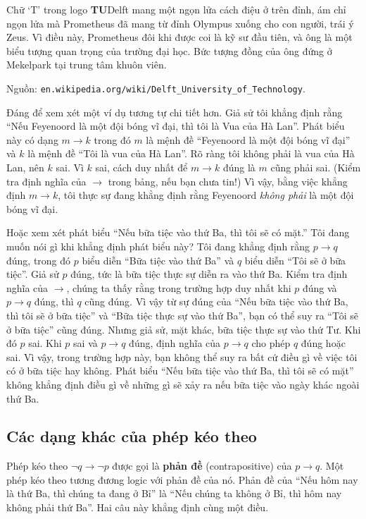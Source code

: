 \begin{infobox}
Chữ `T' trong logo \textbf{TU}Delft mang một ngọn lửa cách điệu ở trên đỉnh, ám chỉ ngọn lửa mà Prometheus đã mang từ đỉnh Olympus xuống cho con người, trái ý Zeus. Vì điều này, Prometheus đôi khi được coi là kỹ sư đầu tiên, và ông là một biểu tượng quan trọng của trường đại học. Bức tượng đồng của ông đứng ở Mekelpark tại trung tâm khuôn viên.

Nguồn: \texttt{en.wikipedia.org/wiki/Delft\_University\_of\_Technology}.
\end{infobox}

Đáng để xem xét một ví dụ tương tự chi tiết hơn. Giả sử tôi khẳng định rằng ``Nếu Feyenoord là một đội bóng vĩ đại, thì tôi là Vua của Hà Lan''. Phát biểu này có dạng $m \to k$ trong đó $m$ là mệnh đề ``Feyenoord là một đội bóng vĩ đại'' và $k$ là mệnh đề ``Tôi là vua của Hà Lan''. Rõ ràng tôi không phải là vua của Hà Lan, nên $k$ sai. Vì $k$ sai, cách duy nhất để $m \to k$ đúng là $m$ cũng phải sai. (Kiểm tra định nghĩa của $\to$ trong bảng, nếu bạn chưa tin!) Vì vậy, bằng việc khẳng định $m \to k$, tôi thực sự đang khẳng định rằng Feyenoord \emph{không phải} là một đội bóng vĩ đại.

Hoặc xem xét phát biểu ``Nếu bữa tiệc vào thứ Ba, thì tôi sẽ có mặt.'' Tôi đang muốn nói gì khi khẳng định phát biểu này? Tôi đang khẳng định rằng $p \to q$ đúng, trong đó $p$ biểu diễn ``Bữa tiệc vào thứ Ba'' và $q$ biểu diễn ``Tôi sẽ ở bữa tiệc''. Giả sử $p$ đúng, tức là bữa tiệc thực sự diễn ra vào thứ Ba. Kiểm tra định nghĩa của $\to$, chúng ta thấy rằng trong trường hợp duy nhất khi $p$ đúng và $p \to q$ đúng, thì $q$ cũng đúng. Vì vậy từ sự đúng của ``Nếu bữa tiệc vào thứ Ba, thì tôi sẽ ở bữa tiệc'' và ``Bữa tiệc thực sự vào thứ Ba'', bạn có thể suy ra ``Tôi sẽ ở bữa tiệc'' cũng đúng. Nhưng giả sử, mặt khác, bữa tiệc thực sự vào thứ Tư. Khi đó $p$ sai. Khi $p$ sai và $p \to q$ đúng, định nghĩa của $p \to q$ cho phép $q$ đúng hoặc sai. Vì vậy, trong trường hợp này, bạn không thể suy ra bất cứ điều gì về việc tôi có ở bữa tiệc hay không. Phát biểu ``Nếu bữa tiệc vào thứ Ba, thì tôi sẽ có mặt'' không khẳng định điều gì về những gì sẽ xảy ra nếu bữa tiệc vào ngày khác ngoài thứ Ba.

\subsection{Các dạng khác của phép kéo theo}

Phép kéo theo $\lnot q \to \lnot p$ được gọi là \textbf{phản đề} (contrapositive) của $p \to q$. Một phép kéo theo tương đương logic với phản đề của nó. Phản đề của ``Nếu hôm nay là thứ Ba, thì chúng ta đang ở Bỉ'' là ``Nếu chúng ta không ở Bỉ, thì hôm nay không phải thứ Ba''. Hai câu này khẳng định cùng một điều.

